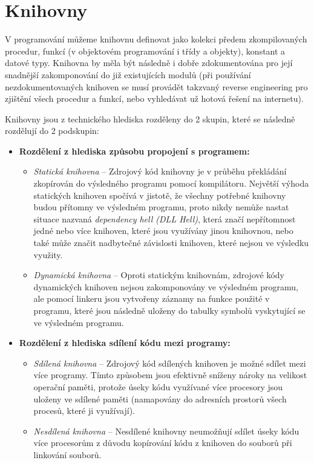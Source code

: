\chapter{Knihovny}
V programování můžeme knihovnu definovat jako kolekci předem zkompilovaných procedur, funkcí (v objektovém programování i třídy a objekty), konstant a datové typy. Knihovna by měla být následně i dobře zdokumentována pro její snadnější zakomponování do již existujících modulů (při používání nezdokumentovaných knihoven se musí provádět takzvaný reverse engineering pro zjištění všech procedur a funkcí, nebo vyhledávat už hotová řešení na internetu). 
\par
Knihovny jsou z technického hlediska rozděleny do 2 skupin, které se následně rozdělují do 2 podskupin:
	\begin{itemize}
	\item \textbf{Rozdělení z hlediska způsobu propojení s programem:}
		\begin{itemize}
		\item \textit{Statická knihovna} -- Zdrojový kód knihovny je v průběhu překládání zkopírován do výsledného programu pomocí kompilátoru. Největší výhoda statických knihoven spočívá v jistotě, že všechny potřebné knihovny budou přítomny ve výsledném programu, proto nikdy nemůže nastat situace nazvaná \textit{dependency hell (DLL Hell)}, která značí nepřítomnost jedné nebo více knihoven, které jsou využívány jinou knihovnou, nebo také může značit nadbytečné závislosti knihoven, které nejsou ve výsledku využity.
		\item \textit{Dynamická knihovna} -- Oproti statickým knihovnám, zdrojové kódy dynamických knihoven nejsou zakomponovány ve výsledném programu, ale pomocí linkeru jsou vytvořeny záznamy na funkce použité v programu, které jsou následně uloženy do tabulky symbolů vyskytující se ve výsledném programu.
		\end{itemize}
	\item \textbf{Rozdělení z hlediska sdílení kódu mezi programy:}
		\begin{itemize}
		\item \textit{Sdílená knihovna} -- Zdrojový kód sdílených knihoven je možné sdílet mezi více programy. Tímto způsobem jsou efektivně sníženy nároky na velikost operační paměti, protože úseky kódu využívané více procesory jsou uloženy ve sdílené paměti (namapovány do adresních prostorů všech procesů, které ji využívají).
		\item \textit{Nesdílená knihovna} -- Nesdílené knihovny neumožňují sdílet úseky kódu více procesorům z důvodu kopírování kódu z knihoven do souborů při linkování souborů.
		\end{itemize}
	\end{itemize}
